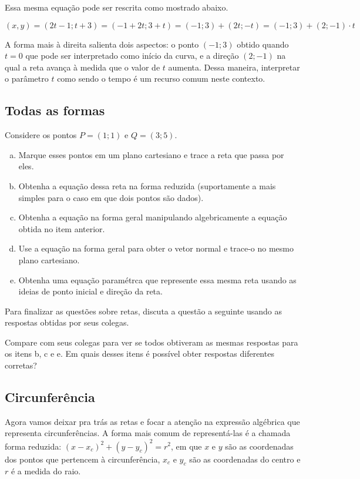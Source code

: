 \documentclass[main_estudante.tex]{subfiles}
\begin{document}
Essa mesma equação pode ser rescrita como mostrado abaixo.

$$(x,y)=(2t-1;t+3)=(-1+2t;3+t)=(-1;3)+(2t;-t)=(-1;3)+(2;-1) \cdot t$$

A forma mais à direita salienta dois aspectos: o ponto $(-1;3)$ obtido quando $t=0$ que pode ser interpretado como início da curva, e a direção $(2;-1)$ na qual a reta avança à medida que o valor de $t$ aumenta. Dessa maneira, interpretar o parâmetro $t$ como sendo o tempo é um recurso comum neste contexto.

\subsection*{Todas as formas}

\begin{questao}
Considere os pontos $P=(1;1)$ e $Q=(3;5)$.
\begin{enumerate}[a)]
\item Marque esses pontos em um plano cartesiano e trace a reta que passa por eles.
\item Obtenha a equação dessa reta na forma reduzida (suportamente a mais simples para o caso em que dois pontos são dados).
\item Obtenha a equação na forma geral manipulando algebricamente a equação obtida no item anterior.
\item Use a equação na forma geral para obter o vetor normal e trace-o no mesmo plano cartesiano.
\item Obtenha uma equação paramétrca que represente essa mesma reta usando as ideias de ponto inicial e direção da reta.
\end{enumerate} 
\end{questao}

Para finalizar as questões sobre retas, discuta a questão a seguinte usando as respostas obtidas por seus colegas.

\begin{reflita}
Compare com seus colegas para ver se todos obtiveram as mesmas respostas para os itens b, c e e. Em quais desses itens é possível obter respostas diferentes corretas? 
\end{reflita}

\subsection*{Circunferência}

Agora vamos deixar pra trás as retas e focar a atenção na expressão algébrica que representa circunferências. A forma mais comum de representá-las é a chamada forma reduzida: $(x-x_c)^2+(y-y_c)^2=r^2$, em que $x$ e $y$ são as coordenadas dos pontos que pertencem à circunferência, $x_c$ e $y_c$ são as coordenadas do centro e $r$ é a medida do raio.
\end{document}
